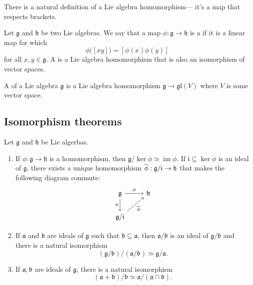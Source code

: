 \documentclass{article}
\newcommand{\lb}[1]{\ensuremath{\left[{#1}\right]}}
\DeclareMathOperator{\im}{im}
\newcommand{\frka}{{\ensuremath{\mathfrak{a}}}}
\newcommand{\frkb}{{\ensuremath{\mathfrak{b}}}}
\newcommand{\frkg}{{\ensuremath{\mathfrak{g}}}}
\newcommand{\frkh}{{\ensuremath{\mathfrak{h}}}}
\newcommand{\frki}{{\ensuremath{\mathfrak{i}}}}
\newcommand{\glalg}{\ensuremath{\mathfrak{gl}}}
\begin{document}
There is a natural definition of a Lie algebra homomorphism--- it's a map that respects brackets.

\begin{definition}
    \label{def:LieAlgHom}
    Let $\frkg$ and $\frkh$ be two Lie algebras.
    We say that a map $\phi: \frkg \to \frkh$ is a  if it is a linear map for which
    \[
        \phi\Big(\lb{xy}\Big)
        =
        \lb{\phi(x)\phi(y)}
    \]
    for all $x,y \in \frkg$. 
    A  is a Lie algebra homomorphism that is also an isomorphism of vector spaces.
\end{definition}


\begin{definition}
    A  of a Lie algebra $\frkg$ is a Lie algebra homomorphism $\frkg \to \glalg(V)$ where $V$ is some vector space.
\end{definition}

\subsection{Isomorphism theorems}

\begin{theorem}
    Let $\frkg$ and $\frkh$ be Lie algerbas.
    \begin{enumerate}[label=(\alph*)]
        \item \label{thm:FirstIsomorphismThm}
            If $\phi: \frkg \to \frkh$ is a homomorphism, then $\frkg / \ker \phi \simeq \im \phi$.
            If $\frki \subseteq \ker \phi$ is an ideal of $\frkg$, there exists a unique homomorphism $\barphi: \frkg/\frki \to \frkh$ that makes the following diagram commute:
            \[
                \begin{tikzcd}
                    \frkg \arrow[r, "\phi"] \arrow[d, "\pi"'] & \frkh \\ 
                                                             \frkg/\frki \arrow[ur, "\barphi"']
                \end{tikzcd}
            \]
        \item 
            If $\frka$ and $\frkb$ are ideals of $\frkg$ such that $\frkb \subseteq \frka$, then $\frka/\frkb$ is an ideal of $\frkg/\frkb$ and there is a natural isomorphism
            \[
                (\frkg/\frkb)/(\frka/\frkb)
                \simeq
                \frkg/\frka.
            \]
        \item 
            If $\frka, \frkb$ are ideals of $\frkg$, there is a natural isomorphism
            \[
                (\frka + \frkb)/\frkb
                \simeq
                \frka/(\frka \cap \frkb).
            \]
    \end{enumerate}
\end{theorem}
\end{document}
